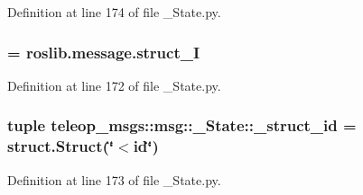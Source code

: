 Definition at line 174 of file \_\-State.py.

\subsubsection[{\_\-struct\_\-I}]{ = roslib.message.struct\_\-I}\label{namespaceteleop__msgs_1_1msg_1_1__State_af99b34cacfdf0f9dd281004f38174c26}


Definition at line 172 of file \_\-State.py.

\subsubsection[{\_\-struct\_\-id}]{\setlength{\rightskip}{0pt plus 5cm}tuple {\bf teleop\_\-msgs::msg::\_\-State::\_\-struct\_\-id} = struct.Struct(\char`\"{}$<$id\char`\"{})}\label{namespaceteleop__msgs_1_1msg_1_1__State_adcae5bedeb3a46e56fd6f27c158f0ecc}


Definition at line 173 of file \_\-State.py.

